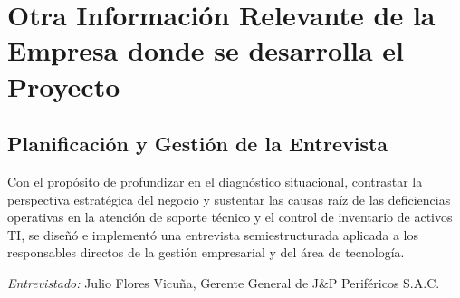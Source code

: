 \section{Otra Información Relevante de la Empresa donde se desarrolla el Proyecto}

\subsection{Planificación y Gestión de la Entrevista}
Con el propósito de profundizar en el diagnóstico situacional, contrastar la perspectiva estratégica del negocio y sustentar las causas raíz de las deficiencias operativas en la atención de soporte técnico y el control de inventario de activos TI, se diseñó e implementó una entrevista semiestructurada aplicada a los responsables directos de la gestión empresarial y del área de tecnología.

\vspace{0.3cm}
\noindent\textit{Entrevistado:} Julio Flores Vicuña, Gerente General de J\&P Periféricos S.A.C.
\vspace{0.4cm}

